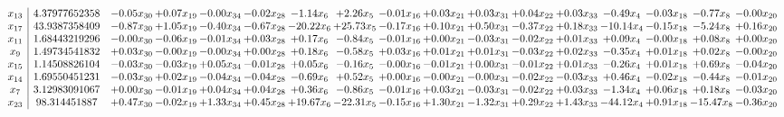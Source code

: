 \documentclass[9pt]{article}
\begin{document}
 \[\begin{array}{c| c c@{\hskip 2pt} c@{\hskip 2pt} c@{\hskip 2pt} c@{\hskip 2pt} c@{\hskip 2pt} c@{\hskip 2pt} c@{\hskip 2pt} c@{\hskip 2pt} c@{\hskip 2pt} c@{\hskip 2pt} c@{\hskip 2pt} c@{\hskip 2pt} c@{\hskip 2pt} c@{\hskip 2pt} c@{\hskip 2pt} }
 x_{13}   &  4.37977652358 & -0.05 x_{30} & +  0.07 x_{19} & -0.00 x_{34} & -0.02 x_{28} & -1.14 x_{6} & +  2.26 x_{5} & -0.01 x_{16} & +  0.03 x_{21} & +  0.03 x_{31} & +  0.04 x_{22} & +  0.03 x_{33} & -0.49 x_{4} & -0.03 x_{18} & -0.77 x_{8} & -0.00 x_{20}\\
 x_{17}   &  43.9387358409 & -0.87 x_{30} & +  1.05 x_{19} & -0.40 x_{34} & -0.67 x_{28} & -20.22 x_{6} & + 25.73 x_{5} & -0.17 x_{16} & +  0.10 x_{21} & +  0.50 x_{31} & -0.37 x_{22} & +  0.18 x_{33} & -10.14 x_{4} & -0.15 x_{18} & -5.24 x_{8} & +  0.16 x_{20}\\
 x_{11}   &  1.68443219296 & -0.00 x_{30} & -0.06 x_{19} & -0.01 x_{34} & +  0.03 x_{28} & +  0.17 x_{6} & -0.84 x_{5} & -0.01 x_{16} & +  0.00 x_{21} & -0.03 x_{31} & -0.02 x_{22} & +  0.01 x_{33} & +  0.09 x_{4} & -0.00 x_{18} & +  0.08 x_{8} & +  0.00 x_{20}\\
 x_{9}   &  1.49734541832 & +  0.03 x_{30} & -0.00 x_{19} & -0.00 x_{34} & +  0.00 x_{28} & +  0.18 x_{6} & -0.58 x_{5} & +  0.03 x_{16} & +  0.01 x_{21} & +  0.01 x_{31} & -0.03 x_{22} & +  0.02 x_{33} & -0.35 x_{4} & +  0.01 x_{18} & +  0.02 x_{8} & -0.00 x_{20}\\
 x_{15}   &  1.14508826104 & -0.03 x_{30} & -0.03 x_{19} & +  0.05 x_{34} & -0.01 x_{28} & +  0.05 x_{6} & -0.16 x_{5} & -0.00 x_{16} & -0.01 x_{21} & +  0.00 x_{31} & -0.01 x_{22} & +  0.01 x_{33} & -0.26 x_{4} & +  0.01 x_{18} & +  0.69 x_{8} & -0.04 x_{20}\\
 x_{14}   &  1.69550451231 & -0.03 x_{30} & +  0.02 x_{19} & -0.04 x_{34} & -0.04 x_{28} & -0.69 x_{6} & +  0.52 x_{5} & +  0.00 x_{16} & -0.00 x_{21} & -0.00 x_{31} & -0.02 x_{22} & -0.03 x_{33} & +  0.46 x_{4} & -0.02 x_{18} & -0.44 x_{8} & -0.01 x_{20}\\
 x_{7}   &  3.12983091067 & +  0.00 x_{30} & -0.01 x_{19} & +  0.04 x_{34} & +  0.04 x_{28} & +  0.36 x_{6} & -0.86 x_{5} & -0.01 x_{16} & +  0.03 x_{21} & -0.03 x_{31} & -0.02 x_{22} & +  0.03 x_{33} & -1.34 x_{4} & +  0.06 x_{18} & +  0.18 x_{8} & -0.03 x_{20}\\
 x_{23}   &  98.314451887 & +  0.47 x_{30} & -0.02 x_{19} & +  1.33 x_{34} & +  0.45 x_{28} & + 19.67 x_{6} & -22.31 x_{5} & -0.15 x_{16} & +  1.30 x_{21} & -1.32 x_{31} & +  0.29 x_{22} & +  1.43 x_{33} & -44.12 x_{4} & +  0.91 x_{18} & -15.47 x_{8} & -0.36 x_{20}\\

\end{array}\]
\end{document}
